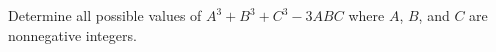 Determine all possible values of $A^3+B^3+C^3-3ABC$ where $A$, $B$, and $C$ are nonnegative integers.